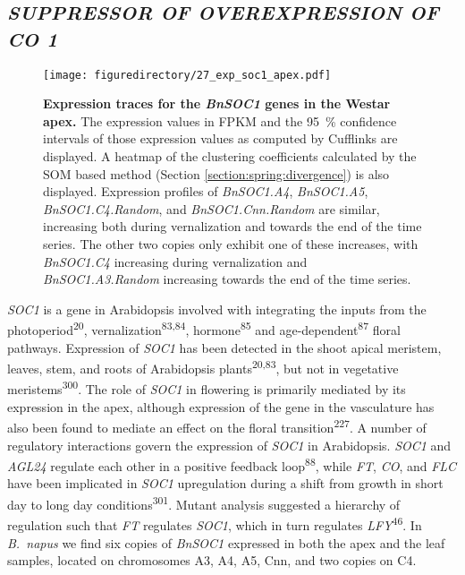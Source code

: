 \documentclass[12pt,]{book}
\begin{document}
\subsection{\texorpdfstring{\emph{SUPPRESSOR OF OVEREXPRESSION OF CO
1}}{SUPPRESSOR OF OVEREXPRESSION OF CO 1}}\label{section:spring:soc1}

\begin{figure}[htbp]
\centering
\texttt{[image: figuredirectory/27\_exp\_soc1\_apex.pdf]}
\caption{\textbf{Expression traces for the \emph{BnSOC1} genes in the
Westar apex.} The expression values in FPKM and the 95~\% confidence
intervals of those expression values as computed by Cufflinks are
displayed. A heatmap of the clustering coefficients calculated by the
SOM based method (Section \ref{section:spring:divergence}) is also
displayed. Expression profiles of \emph{BnSOC1.A4}, \emph{BnSOC1.A5},
\emph{BnSOC1.C4.Random}, and \emph{BnSOC1.Cnn.Random} are similar,
increasing both during vernalization and towards the end of the time
series. The other two copies only exhibit one of these increases, with
\emph{BnSOC1.C4} increasing during vernalization and
\emph{BnSOC1.A3.Random} increasing towards the end of the time
series.}\label{figure:227:soc1apex}
\end{figure}

\emph{SOC1} is a gene in Arabidopsis involved with integrating the
inputs from the photoperiod\textsuperscript{20},
vernalization\textsuperscript{83,84}, hormone\textsuperscript{85} and
age-dependent\textsuperscript{87} floral pathways. Expression of
\emph{SOC1} has been detected in the shoot apical meristem, leaves,
stem, and roots of Arabidopsis plants\textsuperscript{20,83}, but not in
vegetative meristems\textsuperscript{300}. The role of \emph{SOC1} in
flowering is primarily mediated by its expression in the apex, although
expression of the gene in the vasculature has also been found to mediate
an effect on the floral transition\textsuperscript{227}. A number of
regulatory interactions govern the expression of \emph{SOC1} in
Arabidopsis. \emph{SOC1} and \emph{AGL24} regulate each other in a
positive feedback loop\textsuperscript{88}, while \emph{FT}, \emph{CO},
and \emph{FLC} have been implicated in \emph{SOC1} upregulation during a
shift from growth in short day to long day
conditions\textsuperscript{301}. Mutant analysis suggested a hierarchy
of regulation such that \emph{FT} regulates \emph{SOC1}, which in turn
regulates \emph{LFY}\textsuperscript{46}. In \emph{B.~napus} we find six
copies of \emph{BnSOC1} expressed in both the apex and the leaf samples,
located on chromosomes A3, A4, A5, Cnn, and two copies on C4.
\end{document}
